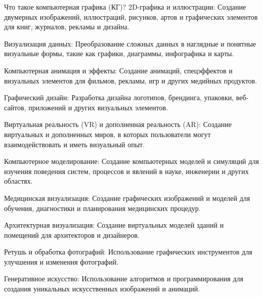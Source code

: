 \documentclass{beamer}
\begin{document}
\begin{frame}{Что такое компьютерная графика (КГ)?}
		2D-графика и иллюстрации: Создание двумерных изображений, иллюстраций, рисунков, артов и графических элементов для книг, журналов, рекламы и дизайна.
		
		Визуализация данных: Преобразование сложных данных в наглядные и понятные визуальные формы, такие как графики, диаграммы, инфографика и карты.
		
		Компьютерная анимация и эффекты: Создание анимаций, спецэффектов и визуальных элементов для фильмов, рекламы, игр и других медийных продуктов.
		
		Графический дизайн: Разработка дизайна логотипов, брендинга, упаковки, веб-сайтов, приложений и других визуальных элементов.
		
		Виртуальная реальность (VR) и дополненная реальность (AR): Создание виртуальных и дополненных миров, в которых пользователи могут взаимодействовать и иметь визуальный опыт.
		
		Компьютерное моделирование: Создание компьютерных моделей и симуляций для изучения поведения систем, процессов и явлений в науке, инженерии и других областях.
		
		Медицинская визуализация: Создание графических изображений и моделей для обучения, диагностики и планирования медицинских процедур.
		
		Архитектурная визуализация: Создание виртуальных моделей зданий и помещений для архитекторов и дизайнеров.
		
		Ретушь и обработка фотографий: Использование графических инструментов для улучшения и изменения фотографий.
		
		Генеративное искусство: Использование алгоритмов и программирования для создания уникальных искусственных изображений и анимаций.
		\fi
		
	\end{frame}
\end{document}

